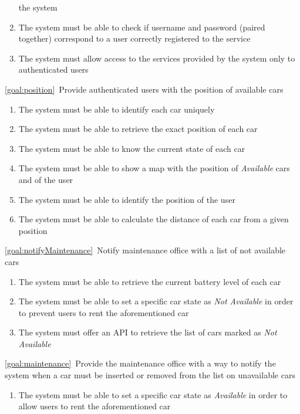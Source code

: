 \begin{description}
\begin{enumerate}[resume*]
  				the system
   				\item The system must be able to check if username and password (paired together)
   				correspond to a user correctly registered to the service
   				\item The system must allow access to the services provided by the system only to
   				authenticated users 
			\end{enumerate}
		\item \ref{goal:position}\ Provide authenticated users with the position of available cars
			\begin{enumerate}[resume*]
				\item The system must be able to identify each car uniquely
  				\item The system must be able to retrieve the exact position of each car
   				\item The system must be able to know the current state of each car
   				\item The system must be able to show a map with the position of \textit{Available} cars
   				and of the user
  				\item The system must be able to identify the position of the user
   				\item The system must be able to calculate the distance of each car from a given position
  			\end{enumerate}
		\item \ref{goal:notifyMaintenance}\ Notify maintenance office with a list of not available cars
			\begin{enumerate}[resume*]
   				\item The system must be able to retrieve the current battery level of each car
   				\item The system must be able to set a specific car state as \textit{Not Available} in order
   				to prevent users to rent the aforementioned car
   				\item The system must offer an API to retrieve the list of cars marked as \textit{Not
   				Available}
  			\end{enumerate}
		\item \ref{goal:maintenance}\ Provide the maintenance office with a way to notify the system
		when a car must be inserted or removed from the list on unavailable cars
			\begin{enumerate}[resume*]
   				\item The system must be able to set a specific car state as \textit{Available} in order to
   				allow users to rent the aforementioned car

\end{enumerate}
\end{description}
